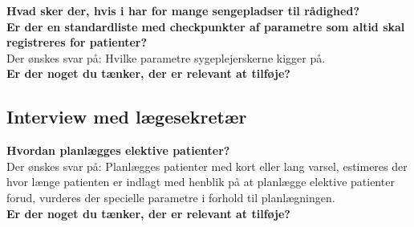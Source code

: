 \noindent
\textbf{Hvad sker der, hvis i har for mange sengepladser til rådighed?} \\
\noindent
\textbf{Er der en standardliste med checkpunkter af parametre som altid skal registreres for patienter?} \\
\noindent
Der ønskes svar på: Hvilke parametre sygeplejerskerne kigger på. \\
\noindent
\textbf{Er der noget du tænker, der er relevant at tilføje?} \\

\subsection{Interview med lægesekretær}
\textbf{Hvordan planlægges elektive patienter?} \\
\noindent
Der ønskes svar på: Planlægges patienter med kort eller lang varsel, estimeres der hvor længe patienten er indlagt med henblik på at planlægge elektive patienter forud, vurderes der specielle parametre i forhold til planlægningen. \\
\noindent
\textbf{Er der noget du tænker, der er relevant at tilføje?} \\




